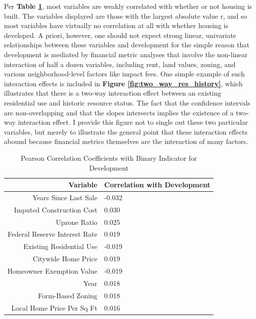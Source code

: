 \documentclass[a4paper,12pt]{article}
\begin{document}
Per \textbf{Table \ref{tab:correlation_with_developed}}, most variables are weakly correlated with whether or not housing is built. The variables displayed are those with the largest absolute value r, and so most variables have virtually no correlation at all with whether housing is developed. A priori, however, one should not expect strong linear, univariate relationships between these variables and development for the simple reason that development is mediated by financial metric analyses that involve the non-linear interaction of half a dozen variables, including rent, land values, zoning, and various neighborhood-level factors like impact fees. One simple example of such interaction effects is included in \textbf{Figure \ref{fig:two_way_res_history}}, which illustrates that there is a two-way interaction effect between an existing residential use and historic resource status. The fact that the confidence intervals are non-overlapping and that the slopes intersects implies the existence of a two-way interaction effect. I provide this figure not to single out these two particular variables, but merely to illustrate the general point that these interaction effects abound because financial metrics themselves are the interaction of many factors.





\begin{table}[hbt]
\centering
\caption{Pearson Correlation Coefficients with Binary Indicator for Development}
\setlength{\tabcolsep}{10pt} 
\begin{tabular}{r l}
\hline
\textbf{Variable} & \textbf{Correlation with Development} \\
\hline
Years Since Last Sale & -0.032 \\
Imputed Construction Cost& 0.030 \\
Upzone Ratio  & 0.025 \\
Federal Reserve Interest Rate  & 0.019 \\
Existing Residential Use & -0.019 \\
Citywide Home Price & 0.019 \\
Homeowner Exemption Value & -0.019 \\
Year & 0.018 \\
Form-Based Zoning & 0.018 \\
Local Home Price Per Sq Ft & 0.016 \\
\hline
\end{tabular}
\label{tab:correlation_with_developed}
\end{table}
\end{document}
